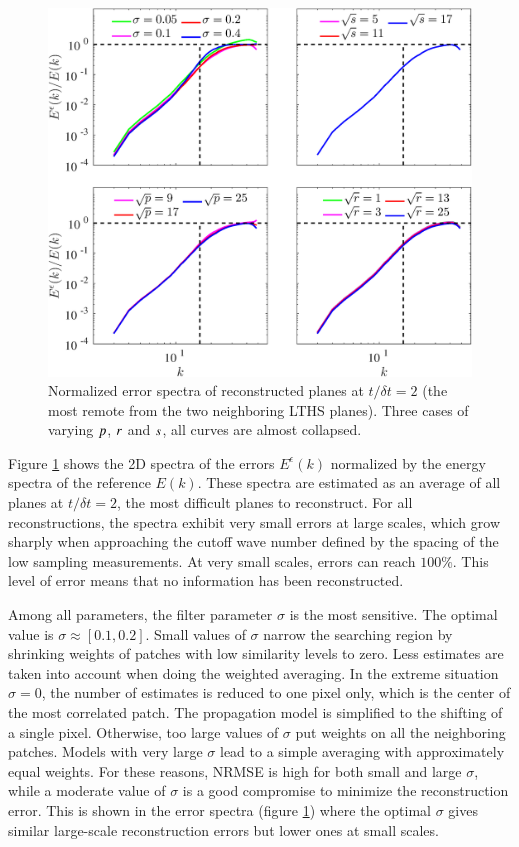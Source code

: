 \begin{figure}[t]
	\centering
	\includegraphics[width=\columnwidth]{./images/NLM/interpdiff/NLmean_propag1dir_spacing3_tspacing4_allparams_spectra.eps}
	\caption{\label{fig:NLM_various_params_spectra} Normalized error spectra of reconstructed planes at $ t/\delta t = 2 $ (the most remote from the two neighboring LTHS planes). Three cases of varying $ p $, $r$ and $s$, all curves are almost collapsed.}
\end{figure}

Figure \ref{fig:NLM_various_params_spectra} shows the 2D spectra of the errors $ E^{\epsilon}(k) $ normalized by the energy spectra of the reference $ E(k) $. These spectra are estimated as an average of all planes at $ t/\delta t =2$, the most difficult planes to reconstruct. For all reconstructions, the spectra exhibit very small errors at large scales, which grow sharply when approaching the cutoff wave number defined by the spacing of the low sampling measurements. At very small scales, errors can reach $ 100 \% $. This level of error means that no information has been reconstructed. 

Among all parameters, the filter parameter $ \sigma $ is the most sensitive. The optimal value is $ \sigma \approx [ 0.1,0.2 ] $. Small values of $ \sigma $ narrow the searching region by shrinking weights of patches with low similarity levels to zero. Less estimates are taken into account when doing the weighted averaging. In the extreme situation $ \sigma = 0 $, the number of estimates is reduced to one pixel only, which is the center of the most correlated patch. The propagation model is simplified to the shifting of a single pixel. Otherwise, too large values of $ \sigma $ put weights on all the neighboring patches. Models with very large $ \sigma $ lead to a simple averaging with approximately equal weights. For these reasons, NRMSE is high for both small and large $ \sigma $, while a moderate value of $ \sigma $ is a good compromise to minimize the reconstruction error. This is shown in the error spectra (figure \ref{fig:NLM_various_params_spectra}) where the optimal $ \sigma $ gives similar large-scale reconstruction errors but lower ones at small scales.

